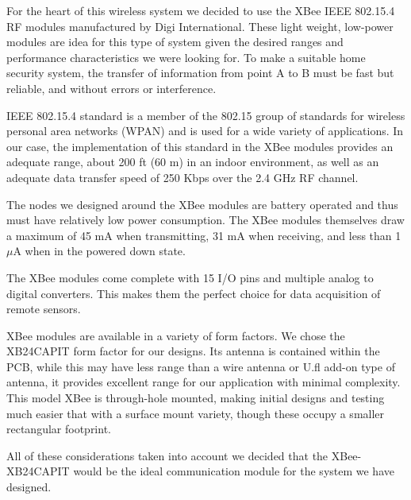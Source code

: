 \par For the heart of this wireless system we decided to use the XBee IEEE 802.15.4 RF modules manufactured by Digi International. These light weight, low-power modules are idea for this type of system given the desired ranges and performance characteristics we were looking for. To make a suitable home security system, the transfer of information from point A to B must be fast but reliable, and without errors or interference.
 \par IEEE 802.15.4 standard is a member of the 802.15 group of standards for wireless personal area networks (WPAN) and is used for a wide variety of applications. In our case, the implementation of this standard in the XBee modules provides an adequate range, about 200 ft (60 m) in an indoor environment, as well as an adequate data transfer speed of 250 Kbps over the 2.4 GHz RF channel.     
\par The nodes we designed around the XBee modules are battery operated and thus must have relatively low power consumption. The XBee modules themselves draw a maximum of 45 mA when transmitting, 31 mA when receiving, and less than 1 $\mu$A when in the powered down state. 
\par The XBee modules come complete with 15 I/O pins and multiple analog to digital converters. This makes them the perfect choice for data acquisition of remote sensors. 
\par XBee modules are available in a variety of form factors. We chose the XB24CAPIT form factor for our designs. Its antenna is contained within the PCB, while this may have less range than a wire antenna or U.fl add-on type of antenna, it provides excellent range for our application with minimal complexity. This model XBee is through-hole mounted, making initial designs and testing much easier that with a surface mount variety, though these occupy a smaller rectangular footprint. 
\par All of these considerations taken into account we decided that the XBee-XB24CAPIT would be the ideal communication module for the system we have designed. \\